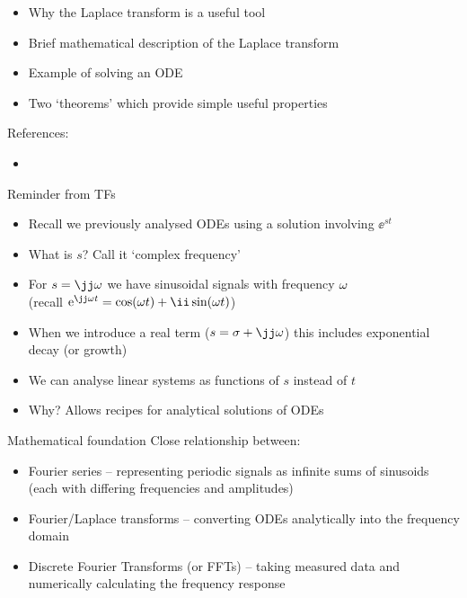 \documentclass{beamer-control}
\begin{document}

\begin{SUMMARY}
\begin{itemize}
\item Why the Laplace transform is a useful tool
\item Brief mathematical description of the Laplace transform
\item Example of solving an ODE
\item Two `theorems' which provide simple useful properties
\end{itemize}
\vfill References:
\begin{itemize}
\item {}
\end{itemize}
\end{SUMMARY}



\begin{frame}{Reminder from TFs}
  \begin{itemize}
    \item Recall we previously analysed ODEs using a solution involving $\ee^{st}$
    \item What is $s$? Call it `complex frequency'
    \item For $s=\jj\ww$ we have sinusoidal signals with frequency $\omega$\\
          (recall $\ee^{\jj\ww t}=\cos(\ww t)+\ii \sin(\ww t)$)
    \item When we introduce a real term ($s=\sigma+\jj\ww$) this includes exponential decay (or growth)
    \item \alert{We can analyse linear systems as functions of $s$ instead of $t$}
    \item Why? Allows recipes for analytical solutions of ODEs 
  \end{itemize}
\end{frame}


\begin{frame}{Mathematical foundation}
  Close relationship between:
  \begin{itemize}
  \item Fourier series -- representing periodic signals as infinite sums of sinusoids (each with differing frequencies and amplitudes)
  \item Fourier/Laplace transforms -- converting ODEs analytically into the frequency domain 
  \item Discrete Fourier Transforms (or FFTs) -- taking measured data and numerically calculating the frequency response
  \end{itemize}
\end{frame}
\end{document}
